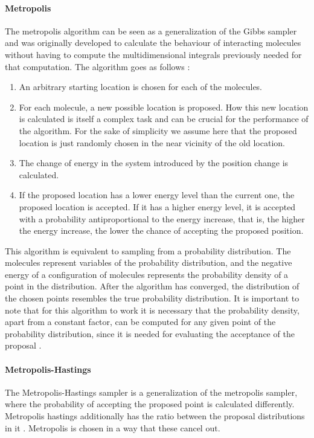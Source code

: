 \documentclass{article}
\begin{document}
\paragraph{Metropolis}
The metropolis algorithm can be seen as a generalization of the Gibbs sampler \cite{1439840954} and was originally developed to calculate the behaviour of interacting molecules without having to compute the multidimensional integrals previously needed for that computation\cite{Metropolis1953}. The algorithm goes as follows : 
\begin{enumerate}
	\item An arbitrary starting location is chosen for each of the molecules. 
	\item For each molecule, a new possible location is proposed. How this new location is calculated is itself a complex task and can be crucial for the performance of the algorithm. For the sake of simplicity we assume here that the proposed location is just randomly chosen in the near vicinity of the old location.
	\item The change of energy in the system introduced by the position change is calculated.
	\item If the proposed location has a lower energy level than the current one, the proposed location is accepted. If it has a higher energy level, it is accepted with
	a probability antiproportional to the energy increase, that is, the higher the energy increase, the lower the chance of accepting the proposed position. 
\end{enumerate}
This algorithm is equivalent to sampling from a probability distribution. The molecules represent variables of the probability distribution, and the negative energy of a configuration of molecules represents the probability density of a point in the distribution. After the algorithm has converged, the distribution of the chosen points resembles the true probability distribution. It is important to note that for this algorithm to work it is necessary that the probability density, apart from a constant factor, can be computed for any given point of the probability distribution, since it is needed for evaluating the acceptance of the proposal \cite{1439840954}.

\paragraph{Metropolis-Hastings}
The Metropolis-Hastings sampler is a generalization of the metropolis sampler, where the probability of accepting the proposed point is calculated differently.
Metropolis hastings additionally has the ratio between the proposal distributions in it \cite{chib1995understanding}. Metropolis is chosen in a way that these cancel out.
\end{document}
